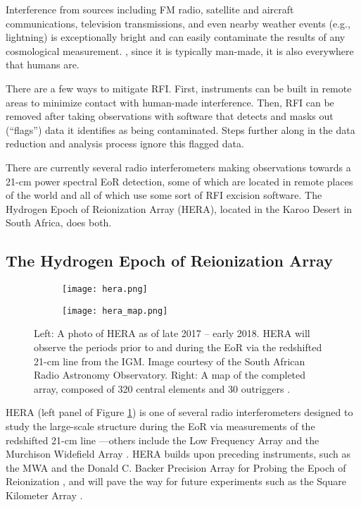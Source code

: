 \documentclass[12pt]{article}
\begin{document}
Interference from sources including FM radio, satellite and aircraft communications, television transmissions, and even nearby weather events (e.g., lightning) is exceptionally bright and can easily contaminate the results of any cosmological measurement. , since it is typically man-made, it is also everywhere that humans are.

There are a few ways to mitigate RFI. First, instruments can be built in remote areas to minimize contact with human-made interference. Then, RFI can be removed after taking observations with software that detects and masks out (``flags'') data it identifies as being contaminated. Steps further along in the data reduction and analysis process ignore this flagged data.

There are currently several radio interferometers making observations towards a 21-cm power spectral EoR detection, some of which are located in remote places of the world and all  of which use some sort of RFI excision software. The Hydrogen Epoch of Reionization Array (HERA), located in the Karoo Desert in South Africa, does both.

\subsection{The Hydrogen Epoch of Reionization Array} \label{subsec:hera}

\begin{figure}[tb]
	\centering
	\begin{subfigure}{0.48\textwidth}
		\centering
		{\texttt{[image: hera.png]}}
	\end{subfigure} \hfill
	\begin{subfigure}{0.48\textwidth}
		\centering
		{\texttt{[image: hera\_map.png]}}
	\end{subfigure}
	\caption[The Hydrogen Epoch of Reionization Array]{Left: A photo of HERA as of late 2017 -- early 2018. HERA will observe the periods prior to and during the EoR via the redshifted 21-cm line from the IGM. Image courtesy of the South African Radio Astronomy Observatory. Right: A map of the completed array, composed of 320 central elements and 30 outriggers \citep{deboer2017}.}
	\label{fig:hera}
\end{figure}

HERA (left panel of Figure \ref{fig:hera}) is one of several radio interferometers designed to study the large-scale structure during the EoR via measurements of the redshifted 21-cm line \citep{deboer2017}---others include the Low Frequency Array \citep[LOFAR;][]{vanHaarlem2013} and the Murchison Widefield Array \citep[MWA;][]{tingay2013}. HERA builds upon preceding instruments, such as the MWA and the Donald C. Backer Precision Array for Probing the Epoch of Reionization \citep[PAPER;][]{parsons2010}, and will pave the way for future experiments such as the Square Kilometer Array \cite[SKA; e.g.,][]{mellema2013}.
\end{document}
